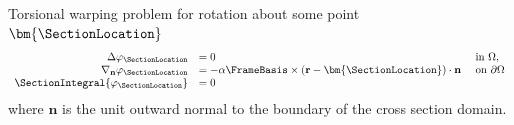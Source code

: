 \begin{marsdenbox}
\noindent
Torsional warping problem for rotation about some point \(\bm{\SectionLocation}\)
\begin{equation}
\begin{array}{rll}
\Delta \varphi_{\SectionLocation} &=0 & \text { in } \Omega, \\
\nabla_{\mathbf{n}} \varphi_{\SectionLocation}  &=-\alpha \FrameBasis \times (\mathbf{r}-\bm{\SectionLocation}) \cdot \mathbf{n} & \text { on } \partial \Omega  \\
\SectionIntegral{\varphi_{\SectionLocation}} &= 0
\end{array}
\label{eq:torsion-neumann}
\end{equation}
where $\mathbf{n}$ is the unit outward normal to the boundary of the cross section domain.
\end{marsdenbox}


